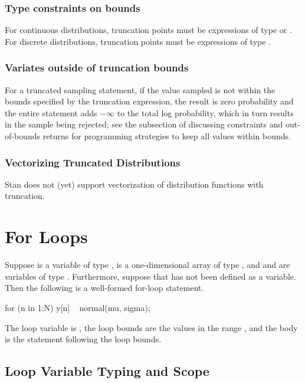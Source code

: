 \subsubsection{Type constraints on bounds}

For continuous distributions, truncation points must be expressions of
type  or .  For discrete distributions, truncation
points must be expressions of type .

\subsubsection{Variates outside of truncation bounds}

For a truncated sampling statement, if the value sampled is not within
the bounds specified by the truncation expression, the result is zero
probability and the entire statement adds $-\infty$ to the total log
probability, which in turn results in the sample being rejected; see
the subsection of  discussing constraints
and out-of-bounds returns for programming strategies to keep
all values within bounds.

\subsubsection{Vectorizing Truncated Distributions}

Stan does not (yet) support vectorization of distribution functions
with truncation.


\section{For Loops}

Suppose
 is a variable of type ,  is a
one-dimensional array of type , and  and
 are variables of type .  Furthermore, suppose
that  has not been defined as a variable. Then the following
is a well-formed for-loop statement.
%
\begin{stancode}
for (n in 1:N) {
  y[n] ~ normal(mu, sigma);
}
\end{stancode}
%
The loop variable is , the loop bounds are the values in the
range , and the body is the statement following the
loop bounds.

\subsection{Loop Variable Typing and Scope}

